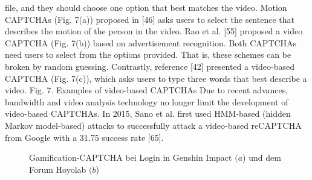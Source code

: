 file, and they should choose one option that best matches the
video. Motion CAPTCHAs (Fig. 7(a)) proposed in [46] asks
users to select the sentence that describes the motion of the
person in the video. Rao et al. [55] proposed a video
CAPTCHA (Fig. 7(b)) based on advertisement recognition.
Both CAPTCHAs need users to select from the options
provided. That is, these schemes can be broken by random
guessing. Contrastly, reference [42] presented a video-based
CAPTCHA (Fig. 7(c)), which asks users to type three words
that best describe a video.
Fig. 7. Examples of video-based CAPTCHAs
Due to recent advances, bandwidth and video analysis
technology no longer limit the development of video-based
CAPTCHAs. In 2015, Sano et al. first used HMM-based
(hidden Markov model-based) attacks to successfully attack a
video-based reCAPTCHA from Google with a 31.75%
success rate [65]. 

\cite{gamified}

\begin{figure}
    \centering
    \qquad
    \caption{Gamification-CAPTCHA bei Login in Genshin Impact $(a$) und dem Forum Hoyolab $(b$)}   
\end{figure}


